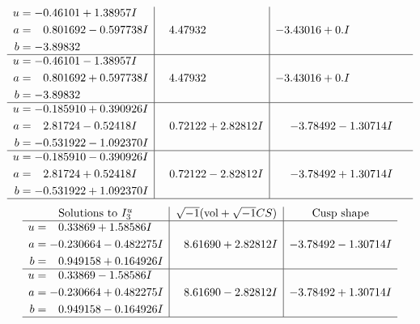 \documentclass[1p]{elsarticle_modified}
\theoremstyle{definition}
\newcommand{\I}{\sqrt{-1}}
\begin{document}
$$\begin{array}{c|c|c}
\begin{aligned}
u &= -0.46101 + 1.38957 I \\
a &= \phantom{-}0.801692 - 0.597738 I \\
b &= -3.89832\phantom{ +0.000000I}\end{aligned}
 & \phantom{-}4.47932\phantom{ +0.000000I} & -3.43016 + 0. I\phantom{ +0.000000I} \\ \hline\begin{aligned}
u &= -0.46101 - 1.38957 I \\
a &= \phantom{-}0.801692 + 0.597738 I \\
b &= -3.89832\phantom{ +0.000000I}\end{aligned}
 & \phantom{-}4.47932\phantom{ +0.000000I} & -3.43016 + 0. I\phantom{ +0.000000I} \\ \hline\begin{aligned}
u &= -0.185910 + 0.390926 I \\
a &= \phantom{-}2.81724 - 0.52418 I \\
b &= -0.531922 - 1.092370 I\end{aligned}
 & \phantom{-}0.72122 + 2.82812 I & -3.78492 - 1.30714 I \\ \hline\begin{aligned}
u &= -0.185910 - 0.390926 I \\
a &= \phantom{-}2.81724 + 0.52418 I \\
b &= -0.531922 + 1.092370 I\end{aligned}
 & \phantom{-}0.72122 - 2.82812 I & -3.78492 + 1.30714 I\\
 \hline 
 \end{array}$$\newpage$$\begin{array}{c|c|c}  
\text{Solutions to }I^u_{3}& \I (\text{vol} + \sqrt{-1}CS) & \text{Cusp shape}\\
 \hline 
\begin{aligned}
u &= \phantom{-}0.33869 + 1.58586 I \\
a &= -0.230664 - 0.482275 I \\
b &= \phantom{-}0.949158 + 0.164926 I\end{aligned}
 & \phantom{-}8.61690 + 2.82812 I & -3.78492 - 1.30714 I \\ \hline\begin{aligned}
u &= \phantom{-}0.33869 - 1.58586 I \\
a &= -0.230664 + 0.482275 I \\
b &= \phantom{-}0.949158 - 0.164926 I\end{aligned}
 & \phantom{-}8.61690 - 2.82812 I & -3.78492 + 1.30714 I\\
 \hline 
 \end{array}$$\newpage\newpage\renewcommand{\arraystretch}{1}
\end{document}
